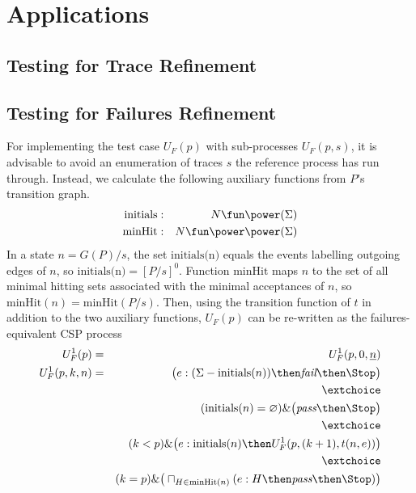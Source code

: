 \section{Applications}
\label{sec:case}




\subsection{Testing for Trace Refinement}
 



\subsection{Testing for Failures Refinement}

For implementing the test case $U_F(p)$ with sub-processes $U_F(p,s)$, 
it is advisable to avoid an enumeration
of traces $s$ the reference process has run through. Instead, we calculate
the following auxiliary functions from $P$'s transition graph.
\begin{eqnarray*}
\text{initials} & : & N \fun \power (\Sigma) 
\\
\text{minHit} & : & N \fun \power\power(\Sigma)
\end{eqnarray*}
In a state $n = G(P)/s$, the set $\text{initials(n)}$ equals the events labelling
outgoing edges of $n$, so  $\text{initials(n)} = [P/s]^0$. Function $\text{minHit}$
maps $n$ to the set of all minimal hitting sets associated with the minimal acceptances
of $n$, so $\text{minHit}(n) = \text{minHit}(P/s)$. Then, using the transition function
of $t$ in addition to the two auxiliary functions, $U_F(p)$ can be re-written
as the failures-equivalent CSP process
\begin{eqnarray}
U_F^1(p) & = & U_F^1(p,0,\ii n)
\\
U_F^1(p,k,n) & = & \big( e:(\Sigma - \text{initials}(n)) \then \efail\then \Stop \big)
\label{eq:xufa}
\\ & & \extchoice \nonumber
\\ & & (\text{initials}(n) = \varnothing)    \&   \big( \epass \then \Stop \big)
\label{eq:xufb}
\\ & & \extchoice \nonumber
\\ & & (k < p) \& \big( e:\text{initials}(n) \then U_F^1(p,(k+1),t(n,e)) \big)
\label{eq:xufc}
\\ & & \extchoice \nonumber
\\ & & (k = p) \& \big( \sqcap_{H\in\text{minHit}(n)} ( e:H \then \epass \then\Stop   )  \big)
\label{eq:xufd}
\end{eqnarray}


\begin{example}
\label{ex:uf1tests}

\end{example}
 
 


